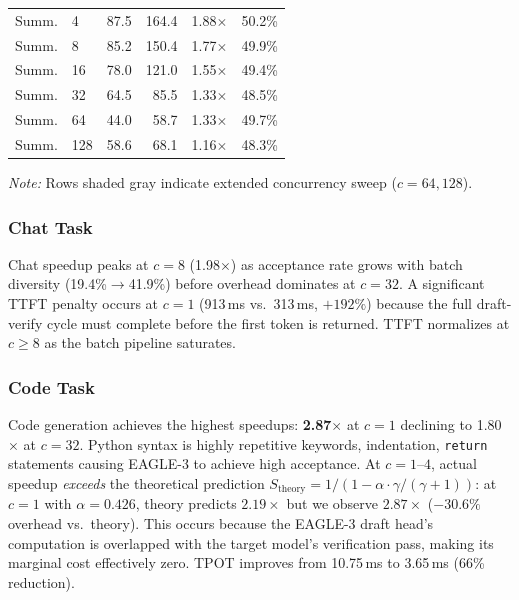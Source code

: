 \documentclass[10pt,twocolumn]{article}
\begin{document}
\begin{table}[h]
\begin{tabular}{llrrrc}
Summ. & 4  & 87.5  & 164.4 & 1.88$\times$ & 50.2\% \\
Summ. & 8  & 85.2  & 150.4 & 1.77$\times$ & 49.9\% \\
Summ. & 16 & 78.0  & 121.0 & 1.55$\times$ & 49.4\% \\
Summ. & 32 & 64.5  & 85.5  & 1.33$\times$ & 48.5\% \\
\rowcolor{gray!15}
Summ. & 64  & 44.0  & 58.7  & 1.33$\times$ & 49.7\% \\
\rowcolor{gray!15}
Summ. & 128 & 58.6  & 68.1  & 1.16$\times$ & 48.3\% \\
\bottomrule
\end{tabular}
\vspace{0.35cm}

{\small \textit{Note:} Rows shaded gray indicate extended concurrency sweep ($c=64, 128$).}
\end{table}

\subsubsection{Chat Task}

Chat speedup peaks at $c=8$ (1.98$\times$) as acceptance rate grows with batch
diversity (19.4\%$\to$41.9\%) before overhead dominates at $c=32$.  A significant
TTFT penalty occurs at $c=1$ (913\,ms vs.\ 313\,ms, $+192\%$) because the full
draft-verify cycle must complete before the first token is returned.  TTFT
normalizes at $c \geq 8$ as the batch pipeline saturates.

\subsubsection{Code Task}

Code generation achieves the highest speedups: \textbf{2.87$\times$} at $c=1$
declining to 1.80$\times$ at $c=32$.  Python syntax is highly repetitive keywords,
indentation, \texttt{return} statements causing EAGLE-3 to achieve high acceptance.
At $c=1$--$4$, actual speedup \emph{exceeds} the theoretical prediction
$S_{\text{theory}} = 1/(1 - \alpha \cdot \gamma/(\gamma+1))$: at $c=1$ with
$\alpha=0.426$, theory predicts $2.19\times$ but we observe $2.87\times$ ($-30.6\%$
overhead vs.\ theory).  This occurs because the EAGLE-3 draft head's computation is
overlapped with the target model's verification pass, making its marginal cost
effectively zero.  TPOT improves from 10.75\,ms to 3.65\,ms (66\% reduction).
\end{document}
